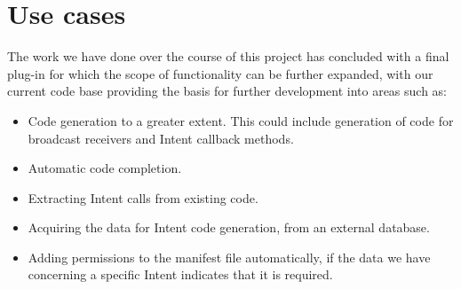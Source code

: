 \section{Use cases}
\label{usecases}

\label{Use cases}
The work we have done over the course of this project has concluded with a final plug-in for which the scope of functionality can be further expanded, with our current code base providing the basis for further development into areas such as:

\begin{itemize}
\item Code generation to a greater extent. This could include generation of code for broadcast receivers and Intent callback methods.
\item Automatic code completion.
\item Extracting Intent calls from existing code.
\item Acquiring the data for Intent code generation, from an external database.
\item Adding permissions to the manifest file automatically, if the data we have concerning a specific Intent indicates that it is required.
\end{itemize}